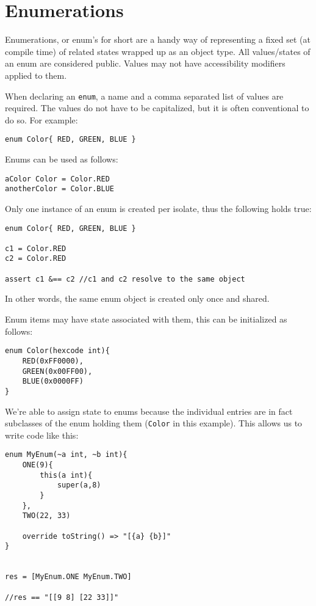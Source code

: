 \documentclass[conc-doc]{subfiles}
\begin{document}
	
	\chapter[Enumerations]{Enumerations}

Enumerations, or enum's for short are a handy way of representing a fixed set (at compile time) of related states wrapped up as an object type. All values/states of an enum are considered public. Values may not have accessibility modifiers applied to them.

When declaring an \lstinline{enum}, a name and a comma separated list of values are required. The values do not have to be capitalized, but it is often conventional to do so. For example:

\begin{lstlisting}
enum Color{ RED, GREEN, BLUE }
\end{lstlisting}

Enums can be used as follows:
\begin{lstlisting}
aColor Color = Color.RED
anotherColor = Color.BLUE
\end{lstlisting}

Only one instance of an enum is created per isolate, thus the following holds true:

\begin{lstlisting}
enum Color{ RED, GREEN, BLUE }

c1 = Color.RED
c2 = Color.RED

assert c1 &== c2 //c1 and c2 resolve to the same object
\end{lstlisting}

In other words, the same enum object is created only once and shared.

Enum items may have state associated with them, this can be initialized as follows:

\begin{lstlisting}
enum Color(hexcode int){
	RED(0xFF0000), 
	GREEN(0x00FF00), 
	BLUE(0x0000FF) 
}
\end{lstlisting}

We're able to assign state to enums because the individual entries are in fact subclasses of the enum holding them (\lstinline{Color} in this example). This allows us to write code like this:
\begin{lstlisting}
enum MyEnum(~a int, ~b int){
	ONE(9){
		this(a int){
			super(a,8)
		}
	},
	TWO(22, 33)
	
	override toString() => "[{a} {b}]"
}


res = [MyEnum.ONE MyEnum.TWO]

//res == "[[9 8] [22 33]]"
\end{lstlisting}
\end{document}
